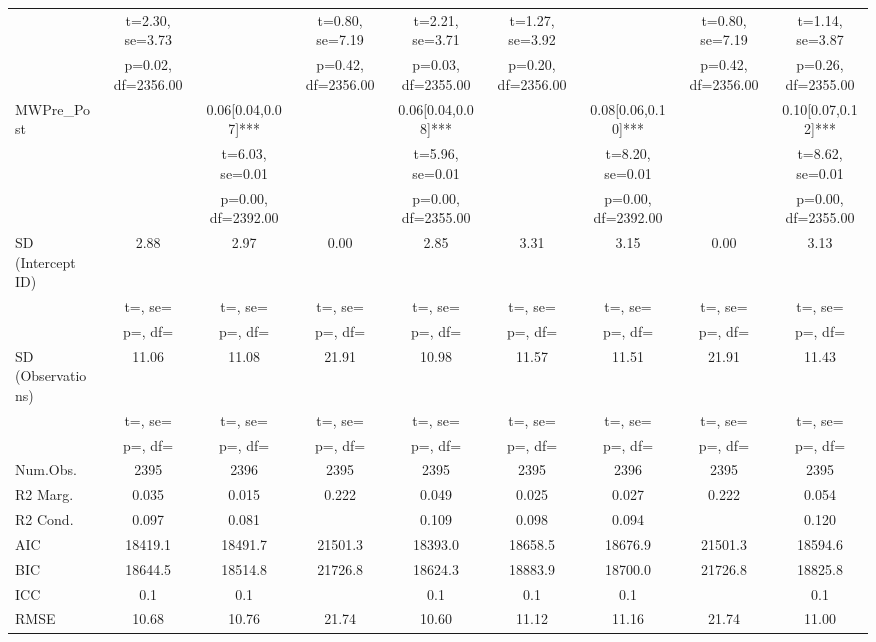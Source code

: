 \documentclass[]{report}
\begin{document}
\begin{table}
{\begin{tabular}[t]{lcccccccc}
		& t=\num{2.30}, se=\num{3.73} &  & t=\num{0.80}, se=\num{7.19} & t=\num{2.21}, se=\num{3.71} & t=\num{1.27}, se=\num{3.92} &  & t=\num{0.80}, se=\num{7.19} & t=\num{1.14}, se=\num{3.87}\\
		& p=\num{0.02}, df=\num{2356.00} &  & p=\num{0.42}, df=\num{2356.00} & p=\num{0.03}, df=\num{2355.00} & p=\num{0.20}, df=\num{2356.00} &  & p=\num{0.42}, df=\num{2356.00} & p=\num{0.26}, df=\num{2355.00}\\
		MWPre\_Post &  & \num{0.06}[\num{0.04},\num{0.07}]*** &  & \num{0.06}[\num{0.04},\num{0.08}]*** &  & \num{0.08}[\num{0.06},\num{0.10}]*** &  & \num{0.10}[\num{0.07},\num{0.12}]***\\
		&  & t=\num{6.03}, se=\num{0.01} &  & t=\num{5.96}, se=\num{0.01} &  & t=\num{8.20}, se=\num{0.01} &  & t=\num{8.62}, se=\num{0.01}\\
		&  & p=\num{0.00}, df=\num{2392.00} &  & p=\num{0.00}, df=\num{2355.00} &  & p=\num{0.00}, df=\num{2392.00} &  & p=\num{0.00}, df=\num{2355.00}\\
		SD (Intercept ID) & \num{2.88} & \num{2.97} & \num{0.00} & \num{2.85} & \num{3.31} & \num{3.15} & \num{0.00} & \num{3.13}\\
		& t=, se= & t=, se= & t=, se= & t=, se= & t=, se= & t=, se= & t=, se= & t=, \vphantom{1} se=\\
		& p=, df= & p=, df= & p=, df= & p=, df= & p=, df= & p=, df= & p=, df= & p=, \vphantom{1} df=\\
		SD (Observations) & \num{11.06} & \num{11.08} & \num{21.91} & \num{10.98} & \num{11.57} & \num{11.51} & \num{21.91} & \num{11.43}\\
		& t=, se= & t=, se= & t=, se= & t=, se= & t=, se= & t=, se= & t=, se= & t=, se=\\
		& p=, df= & p=, df= & p=, df= & p=, df= & p=, df= & p=, df= & p=, df= & p=, df=\\
		\midrule
		Num.Obs. & \num{2395} & \num{2396} & \num{2395} & \num{2395} & \num{2395} & \num{2396} & \num{2395} & \num{2395}\\
		R2 Marg. & \num{0.035} & \num{0.015} & \num{0.222} & \num{0.049} & \num{0.025} & \num{0.027} & \num{0.222} & \num{0.054}\\
		R2 Cond. & \num{0.097} & \num{0.081} &  & \num{0.109} & \num{0.098} & \num{0.094} &  & \num{0.120}\\
		AIC & \num{18419.1} & \num{18491.7} & \num{21501.3} & \num{18393.0} & \num{18658.5} & \num{18676.9} & \num{21501.3} & \num{18594.6}\\
		BIC & \num{18644.5} & \num{18514.8} & \num{21726.8} & \num{18624.3} & \num{18883.9} & \num{18700.0} & \num{21726.8} & \num{18825.8}\\
		ICC & \num{0.1} & \num{0.1} &  & \num{0.1} & \num{0.1} & \num{0.1} &  & \num{0.1}\\
		RMSE & \num{10.68} & \num{10.76} & \num{21.74} & \num{10.60} & \num{11.12} & \num{11.16} & \num{21.74} & \num{11.00}\\
		\bottomrule
	\end{tabular}}
\end{table}
\end{document}
